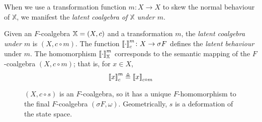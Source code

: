 When we use a transformation function $m\colon X\rightarrow X$ to skew the normal behaviour of $\mathbb{X}$, we manifest the \emph{latent coalgebra of $\mathbb{X}$ under $m$}. 
\begin{definition}
Given an $F$-coalgebra ${\mathbb{X}}=(X,c)$ and a transformation $m$, the \emph{latent coalgebra under $m$} is $(X,c\circ m)$. 
The function ${{\llbracket\cdot\rrbracket}}^{m}_{c}\colon X\rightarrow \sigma F$ defines the \emph{latent behaviour} under $m$. The homomorphism ${{\llbracket\cdot\rrbracket}}^{m}_{\mathbb{X}}$ corresponds to the semantic mapping of the $F$-coalgebra $(X,c\circ m)$; that is, for $x\in X$, 
\begin{align}
{{\llbracket x\rrbracket}}^{m}_{c}\triangleq{{\llbracket x\rrbracket}}_{{c\circ m}}
\end{align}
\end{definition}
\begin{figure}
    \centering
    \caption{$(X,c\circ s)$ is an $F$-coalgebra, so it has a unique $F$-homomorphism to the final $F$-coalgebra $(\sigma F, \omega)$. Geometrically, $s$ is a deformation of the state space.}
\end{figure}
